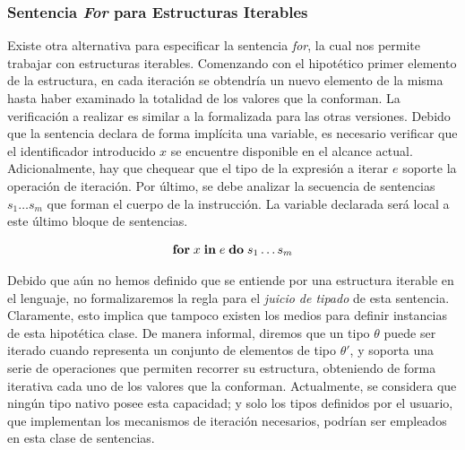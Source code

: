 \subsubsection{Sentencia \emph{For} para Estructuras Iterables}

Existe otra alternativa para especificar la sentencia \textit{for}, la cual nos permite trabajar con estructuras iterables.
Comenzando con el hipotético primer elemento de la estructura, en cada iteración se obtendría un nuevo elemento de la misma hasta haber examinado la totalidad de los valores que la conforman.
La verificación a realizar es similar a la formalizada para las otras versiones.
Debido que la sentencia declara de forma implícita una variable, es necesario verificar que el identificador introducido $x$ se encuentre disponible en el alcance actual.
Adicionalmente, hay que chequear que el tipo de la expresión a iterar $e$ soporte la operación de iteración.
Por último, se debe analizar la secuencia de sentencias $s_{1} \ldots s_{m}$ que forman el cuerpo de la instrucción.
La variable declarada será local a este último bloque de sentencias.


\begin{gather*}
\mathbf{for} \; x \; \mathbf{in} \; e \; \mathbf{do} \; s_{1} \ldots s_{m}
\end{gather*}

Debido que aún no hemos definido que se entiende por una estructura iterable en el lenguaje, no formalizaremos la regla para el \textit{juicio de tipado} de esta sentencia.
Claramente, esto implica que tampoco existen los medios para definir instancias de esta hipotética clase.
De manera informal, diremos que un tipo $\theta$ puede ser iterado cuando representa un conjunto de elementos de tipo $\theta'$, y soporta una serie de operaciones que permiten recorrer su estructura, obteniendo de forma iterativa cada uno de los valores que la conforman.
Actualmente, se considera que ningún tipo nativo posee esta capacidad; y solo los tipos definidos por el usuario, que implementan los mecanismos de iteración necesarios, podrían ser empleados en esta clase de sentencias.